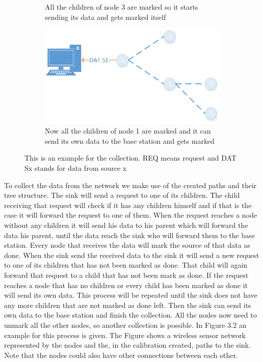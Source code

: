 \begin{figure}[htbp]
\begin{subfigure}[t]{0.4\textwidth}
        \caption{All the children of node 3 are marked so it starts sending its data and gets marked itself}
        \label{fig:link}
    \end{subfigure}
    \quad
    \quad
    \begin{subfigure}[t]{0.4\textwidth}
		\centering         
        \includegraphics[scale=0.6]{content/images/Collection/Part9}
        \caption{Now all the children of node 1 are marked and it can send its own data to the base station and gets marked}
        \label{fig:link}
    \end{subfigure}
    \caption{This is an example for the collection. REQ means request and DAT Sx stands for data from source x}
\end{figure}

To collect the data from the network we make use of the created paths and their tree structure. The sink will send a request to one of its children. The child receiving that request will check if it has any children himself and if that is the case it will forward the request to one of them. When the request reaches a node without any children it will send his data to his parent which will forward the data his parent, until the data reach the sink who will forward them to the base station. Every node that receives the data will mark the source of that data as done. When the sink send the received data to the sink it will send a new request to one of its children that has not been marked as done. That child will again forward that request to a child that has not been mark as done. If the request reaches a node that has no children or every child has been marked as done it will send its own data. This process will be repeated until the sink does not have any more children that are not marked as done left. Then the sink can send its own data to the base station and finish the collection. All the nodes now need to unmark all the other nodes, so another collection is possible. In Figure 3.2 an example for this process is given. The Figure shows a wireless sensor network represented by the nodes and the, in the calibration created, paths to the sink. Note that the nodes could also have other connections between each other.

